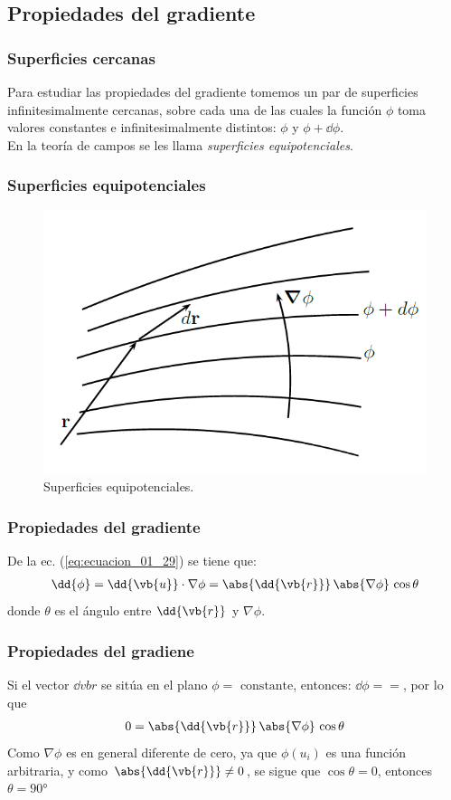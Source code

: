 \subsection{Propiedades del gradiente}
\begin{frame}
\frametitle{Superficies cercanas}
Para estudiar las propiedades del gradiente tomemos un par de superficies infinitesimalmente cercanas, sobre cada una de las cuales la función $\phi$ toma valores constantes e infinitesimalmente distintos: $\phi$ y $\phi + \dd{\phi}$.
\\
\bigskip
\pause
En la teoría de campos se les llama \emph{superficies equipotenciales}.
\end{frame}
\begin{frame}
\frametitle{Superficies equipotenciales}
\begin{figure}[h!]
    \centering
    \includegraphics[scale=0.5]{Imagenes/Superficies_Equipotenciales.png}
    \caption{Superficies equipotenciales.}
    \label{fig:Superficies_Equipotenciales}
\end{figure}
\end{frame}
\begin{frame}
\frametitle{Propiedades del gradiente}
De la ec. (\ref{eq:ecuacion_01_29}) se tiene que:
\begin{align*}
\dd{\phi} = \dd{\vb{u}} \cdot \nabla{\phi} = \abs{\dd{\vb{r}}} \, \abs{\nabla{\phi}} \, \cos \theta
\end{align*}
donde $\theta$ es el ángulo entre $\dd{\vb{r}}$ y $\nabla{\phi}$.
\end{frame}
\begin{frame}
\frametitle{Propiedades del gradiene}
Si el vector $\dd{vb{r}}$ se sitúa en el plano $\phi = \mbox{ constante}$, entonces: $\dd{\phi} = =$, por lo que
\begin{align*}
0 = \abs{\dd{\vb{r}}} \, \abs{\nabla{\phi}} \, \cos \theta
\end{align*}
\pause
Como $\nabla{\phi}$ es en general diferente de cero, ya que $\phi(u_{i})$ es una función arbitraria, y como $\abs{\dd{\vb{r}}} \neq 0$, se sigue que $\cos \theta = 0$, entonces $\theta = \ang{90}$
\end{frame}

